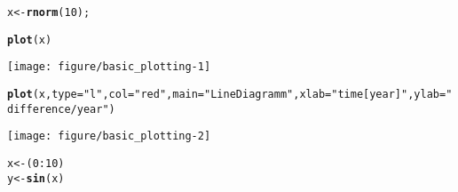 \documentclass[a4paper,10pt]{book}\usepackage[]{graphicx}\usepackage[]{color}
\makeatletter
\def\maxwidth{ %
  \ifdim\Gin@nat@width>\linewidth
    \linewidth
  \else
    \Gin@nat@width
  \fi
}
\newcommand{\hlnum}[1]{\textcolor[rgb]{0.686,0.059,0.569}{#1}}%
\newcommand{\hlstr}[1]{\textcolor[rgb]{0.192,0.494,0.8}{#1}}%
\newcommand{\hlopt}[1]{\textcolor[rgb]{0,0,0}{#1}}%
\newcommand{\hlstd}[1]{\textcolor[rgb]{0.345,0.345,0.345}{#1}}%
\newcommand{\hlkwb}[1]{\textcolor[rgb]{0.69,0.353,0.396}{#1}}%
\newcommand{\hlkwc}[1]{\textcolor[rgb]{0.333,0.667,0.333}{#1}}%
\newcommand{\hlkwd}[1]{\textcolor[rgb]{0.737,0.353,0.396}{\textbf{#1}}}%
\newenvironment{kframe}{%
 \def\at@end@of@kframe{}%
 \ifinner\ifhmode%
  \def\at@end@of@kframe{\end{minipage}}%
  \begin{minipage}{\columnwidth}%
 \fi\fi%
 \def\FrameCommand##1{\hskip\@totalleftmargin \hskip-\fboxsep
 \colorbox{shadecolor}{##1}\hskip-\fboxsep
     \hskip-\linewidth \hskip-\@totalleftmargin \hskip\columnwidth}%
 \MakeFramed {\advance\hsize-\width
   \@totalleftmargin\z@ \linewidth\hsize
   \@setminipage}}%
 {\par\unskip\endMakeFramed%
 \at@end@of@kframe}
\newenvironment{knitrout}{}{} %
\makeatother
\begin{document}
\begin{knitrout}
\color{fgcolor}\begin{kframe}
\begin{alltt}
\hlstd{x} \hlkwb{<-} \hlkwd{rnorm}\hlstd{(}\hlnum{10}\hlstd{);}

\hlkwd{plot}\hlstd{(x)}
\end{alltt}
\end{kframe}
\texttt{[image: figure/basic\_plotting-1]} 
\begin{kframe}\begin{alltt}
\hlkwd{plot}\hlstd{(x,} \hlkwc{type}\hlstd{=}\hlstr{"l"}\hlstd{,} \hlkwc{col}\hlstd{=}\hlstr{"red"}\hlstd{,} \hlkwc{main}\hlstd{=}\hlstr{"Line Diagramm"}\hlstd{,} \hlkwc{xlab}\hlstd{=}\hlstr{"time [year]"}\hlstd{,} \hlkwc{ylab}\hlstd{=}\hlstr{"difference/year"}\hlstd{)}
\end{alltt}
\end{kframe}
\texttt{[image: figure/basic\_plotting-2]} 
\begin{kframe}\begin{alltt}
\hlstd{x} \hlkwb{<-} \hlstd{(}\hlnum{0}\hlopt{:}\hlnum{10}\hlstd{)}
\hlstd{y} \hlkwb{<-} \hlkwd{sin}\hlstd{(x)}


\end{alltt}
\end{kframe}
\end{knitrout}
\end{document}

